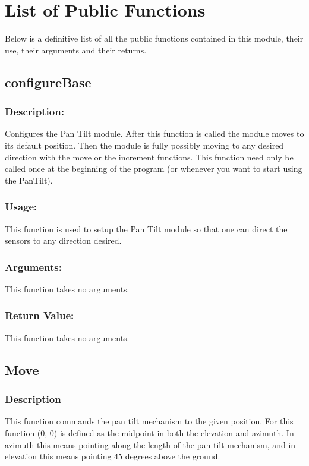\documentclass[]{report}
\begin{document}
\section{List of Public Functions}
Below is a definitive list of all the public functions contained in this module, their use, their arguments and their returns.

\subsection{configureBase}
\subsubsection{Description:}
Configures the Pan Tilt module. After this function is called the module moves to its default position. Then the module is fully possibly moving to any desired direction with the move or the increment functions. This function need only be called once at the beginning of the program (or whenever you want to start using the PanTilt).

\subsubsection{Usage:}
This function is used to setup the Pan Tilt module so that one can direct the sensors to any direction desired. 

\subsubsection{Arguments:}
This function takes no arguments.

\subsubsection{Return Value:}
This function takes no arguments.

\subsection{Move}
\subsubsection{Description}
This function commands the pan tilt mechanism to the given position. For this function (0, 0) is defined as the midpoint in both the elevation and azimuth. In azimuth this means pointing along the length of the pan tilt mechanism, and in elevation this means pointing 45 degrees above the ground.
\end{document}
